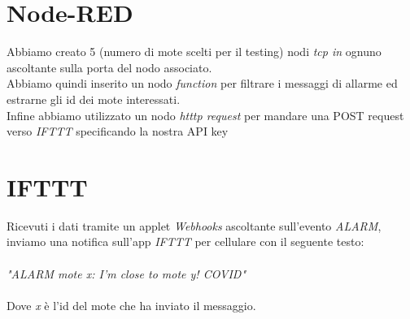\documentclass{article}
\begin{document}
\section{Node-RED}

Abbiamo creato 5 (numero di mote scelti per il testing) nodi \textit{tcp in} ognuno ascoltante sulla porta del nodo associato.\\
Abbiamo quindi inserito un nodo \textit{function} per filtrare i messaggi di allarme ed estrarne gli id dei mote interessati.\\
Infine abbiamo utilizzato un nodo \textit{htttp request} per mandare una POST request verso \textit{IFTTT} specificando la nostra API key

\section{IFTTT}
Ricevuti i dati tramite un applet \textit{Webhooks} ascoltante sull'evento \textit{ALARM},
inviamo una notifica sull'app \textit{IFTTT} per cellulare con il seguente testo:\\\\
\textit{"ALARM mote x: I'm close to mote y! COVID"}\\\\
Dove \textit{x} è l'id del mote che ha inviato il messaggio.
\end{document}
